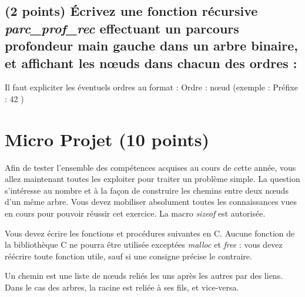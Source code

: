 \documentclass[11pt,a4paper]{article}
\begin{document}

\subsection{(2 points) \'Ecrivez une fonction récursive \og \textit{parc\_prof\_rec} \fg{} effectuant un parcours profondeur main gauche dans un arbre binaire, et affichant les nœuds dans chacun des ordres : }

\noindent Il faut expliciter les éventuels ordres au format : \og Ordre : nœud \fg{} (exemple : \og Préfixe : 42 \fg{})

\begin{center}
\end{center}





\clearpage



\section{Micro Projet (10 points)}

\noindent Afin de tester l'ensemble des compétences acquises au cours de cette année, vous allez maintenant toutes les exploiter pour traiter un problème simple.
La question s'intéresse au nombre et à la façon de construire les chemins entre deux nœuds d'un même arbre.
Vous devez mobiliser absolument toutes les connaissances vues en cours pour pouvoir réussir cet exercice.
La macro \textit{sizeof} est autorisée.

\noindent Vous devez écrire les fonctions et procédures suivantes en C.
Aucune fonction de la bibliothèque C ne pourra être utilisée exceptées \textit{malloc} et \textit{free} : vous devez réécrire toute fonction utile, sauf si une consigne précise le contraire.

\medskip

\noindent Un chemin est une liste de nœuds reliés les uns après les autres par des liens.
Dans le cas des arbres, la racine est reliée à ses fils, et vice-versa.
\end{document}

